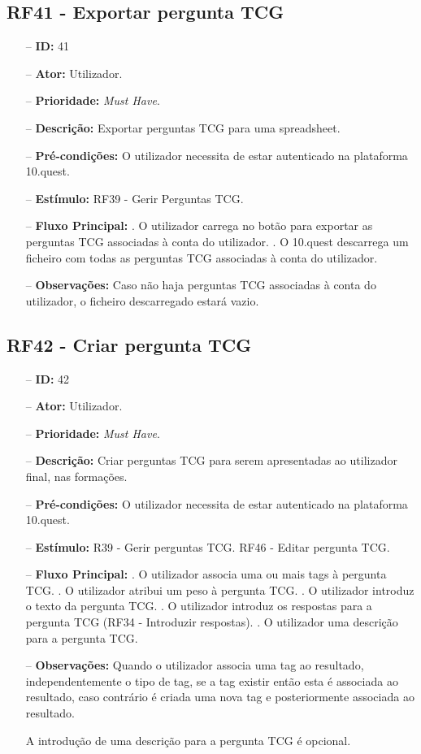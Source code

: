 \subsection{RF41 - Exportar pergunta TCG}
\begin{itemize}
	\item[--] \textbf{ID:} 41
	\item[--]  \textbf{Ator:} Utilizador.
	\item[--]  \textbf{Prioridade:} \textit{Must Have}.
	\item[--]  \textbf{Descrição:} Exportar perguntas TCG para uma spreadsheet.
	\item[--]  \textbf{Pré-condições:} O utilizador necessita de estar autenticado na plataforma 10.quest.
	\item[--]  \textbf{Estímulo:} RF39 - Gerir Perguntas TCG.
	\item[--]  \textbf{Fluxo Principal:} 
	. O utilizador carrega no botão para exportar as perguntas TCG associadas à conta do utilizador.
	. O 10.quest descarrega um ficheiro com todas as perguntas TCG associadas à conta do utilizador.
	\item[--]  \textbf{Observações:} Caso não haja perguntas TCG associadas à conta do utilizador, o ficheiro descarregado estará vazio.
\end{itemize}
\newpage

\subsection{RF42 - Criar pergunta TCG}
\begin{itemize}
	\item[--] \textbf{ID:} 42
	\item[--]  \textbf{Ator:} Utilizador.
	\item[--]  \textbf{Prioridade:} \textit{Must Have}.
	\item[--]  \textbf{Descrição:} Criar perguntas TCG para serem apresentadas ao utilizador final, nas formações.
	\item[--]  \textbf{Pré-condições:} O utilizador necessita de estar autenticado na plataforma 10.quest.
	\item[--]  \textbf{Estímulo:}  
	\subitem R39 - Gerir perguntas TCG.
	\subitem RF46 - Editar pergunta TCG.
	\item[--]  \textbf{Fluxo Principal:} 
	. O utilizador associa uma ou mais tags à pergunta TCG.
	. O utilizador atribui um peso à pergunta TCG.
	. O utilizador introduz o texto da pergunta TCG.
	. O utilizador introduz os respostas para a pergunta TCG (RF34 - Introduzir respostas).
	. O utilizador uma descrição para a pergunta TCG.	
	\item[--]  \textbf{Observações:} 
	Quando o utilizador associa uma tag ao resultado, independentemente o tipo de tag, se a tag existir então esta é associada ao resultado, caso contrário é criada uma nova tag e posteriormente associada ao resultado.
	
	A introdução de uma descrição para a pergunta TCG é opcional.
\end{itemize}
\newpage

